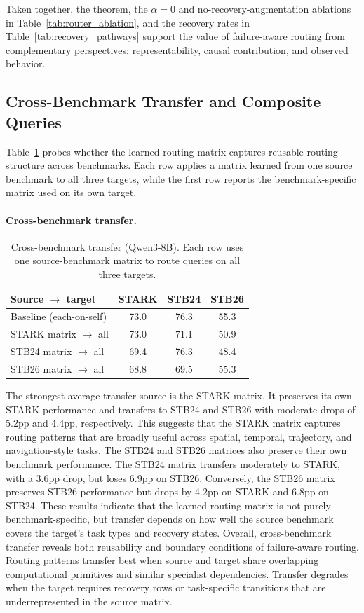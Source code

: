 Taken together, the theorem, the $\alpha=0$ and no-recovery-augmentation ablations in Table~\ref{tab:router_ablation}, and the recovery rates in Table~\ref{tab:recovery_pathways} support the value of failure-aware routing from complementary perspectives: representability, causal contribution, and observed behavior.


\subsection{Cross-Benchmark Transfer and Composite Queries}
\label{sec:generalization}


Table~\ref{tab:cross} probes whether the learned routing matrix captures reusable routing structure across benchmarks.
Each row applies a matrix learned from one source benchmark to all three targets, while the first row reports the benchmark-specific matrix used on its own target.

\paragraph{Cross-benchmark transfer.}
\setlength{\intextsep}{2pt}\setlength{\columnsep}{8pt}
\begin{table}
\centering
\caption{Cross-benchmark transfer (Qwen3-8B).  Each row uses one source-benchmark matrix to route queries on all three targets.}
\label{tab:cross}
\scriptsize
\setlength{\tabcolsep}{4pt}
\begin{tabular}{lccc}
\toprule
Source $\to$ target     & STARK & STB24 & STB26 \\
\midrule
Baseline (each-on-self) & 73.0 & 76.3 & 55.3 \\
STARK matrix $\to$ all  & 73.0 & 71.1 & 50.9 \\
STB24 matrix $\to$ all  & 69.4 & 76.3 & 48.4 \\
STB26 matrix $\to$ all  & 68.8 & 69.5 & 55.3 \\
\bottomrule
\end{tabular}
\end{table}
The strongest average transfer source is the STARK matrix.
It preserves its own STARK performance and transfers to STB24 and STB26 with moderate drops of 5.2pp and 4.4pp, respectively.
This suggests that the STARK matrix captures routing patterns that are broadly useful across spatial, temporal, trajectory, and navigation-style tasks. The STB24 and STB26 matrices also preserve their own benchmark performance. The STB24 matrix transfers moderately to STARK, with a 3.6pp drop, but loses 6.9pp on STB26.
Conversely, the STB26 matrix preserves STB26 performance but drops by 4.2pp on STARK and 6.8pp on STB24.
These results indicate that the learned routing matrix is not purely benchmark-specific, but transfer depends on how well the source benchmark covers the target's task types and recovery states. Overall, cross-benchmark transfer reveals both reusability and boundary conditions of failure-aware routing.
Routing patterns transfer best when source and target share overlapping computational primitives and similar specialist dependencies.
Transfer degrades when the target requires recovery rows or task-specific transitions that are underrepresented in the source matrix.

